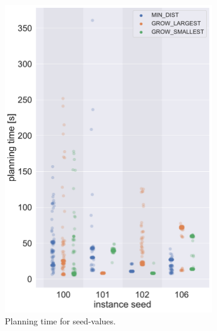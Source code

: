 \begin{figure}
	\centering
	\begin{subfigure}[h]{0.5\textwidth}
		\centering
		\includegraphics[width=\textwidth]{figures/plots/AR_time.pdf}
		\caption{Planning time for seed-values.}
		\label{fig:AR_time}
	\end{subfigure}%
	\begin{subfigure}[h]{0.5\textwidth}
		\centering

\end{subfigure}
\end{figure}
